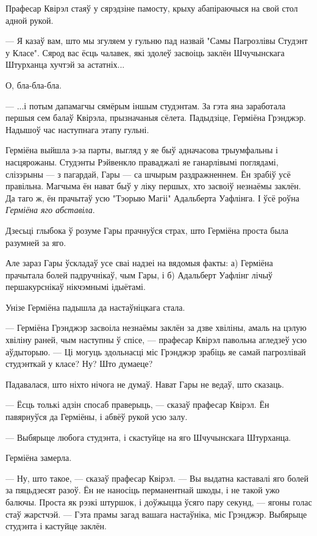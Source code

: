 Прафесар Квірэл стаяў у сярэдзіне памосту, крыху абапіраючыся на свой стол адной рукой.

--- Я казаў вам, што мы згуляем у гульню пад назвай "Самы Пагрозлівы Студэнт у Класе".
Сярод вас ёсць чалавек, які здолеў засвоіць заклён Шчучынскага Штурханца хучтэй за астатніх...

О, бла-бла-бла.

--- ...і потым дапамагчы сямёрым іншым студэнтам. За гэта яна заработала першыя сем балаў 
Квірэла, прызначаныя сёлета. Падыдзіце, Герміёна Грэнджэр. Надышоў час наступнага этапу 
гульні. 

Герміёна выйшла з-за парты, выгляд у яе быў адначасова трыумфальны і насцярожаны.
Студэнты Рэйвенкло праваджалі яе ганарлівымі поглядамі, слізэрыны --- з пагардай,
Гары --- са шчырым раздражненнем. Ён зрабіў усё правільна. Магчыма ён нават быў 
у ліку першых, хто засвоіў незнаёмы заклён. Да таго ж, ён прачытаў усю "Тэорыю Магіі"
Адальберта Уафлінга. І ўсё роўна  \emph{Герміёна яго абставіла}.

Дзесьці глыбока ў розуме Гары прачнуўся страх, што Герміёна проста была 
разумней за яго.

Але зараз Гары ўскладаў усе сваі надзеі на вядомыя факты: а) Герміёна прачытала 
болей падручнікаў, чым Гары, і б) Адальберт Уафлінг лічыў першакурснікаў нікчэмнымі
ідыётамі.

Унізе Герміёна падышла да настаўніцкага стала.

--- Герміёна Грэнджэр засвоіла незнаёмы заклён за дзве хвіліны, амаль на цэлую 
хвіліну раней, чым наступны ў спісе, --- прафесар Квірэл павольна агледзеў 
усю аўдыторыю. --- Ці могуць здольнасці міс Грэнджэр зрабіць яе самай 
пагрозлівай студэнткай у класе? Ну? Што думаеце?

Падавалася, што ніхто нічога не думаў. Нават Гары не ведаў, што сказаць.

--- Ёсць толькі адзін спосаб праверыць, --- сказаў прафесар Квірэл. Ён павярнуўся 
да Герміёны, і абвёў рукой усю залу.

--- Выбярыце любога студэнта, і скастуйце на яго Шчучынскага Штурханца.

Герміёна замерла.

--- Ну, што такое, --- сказаў прафесар Квірэл. --- Вы выдатна каставалі яго 
болей за пяцьдзесят разоў. Ён не наносіць перманентнай шкоды, і не такой ужо балючы.
Проста як рэзкі штуршок, і доўжыцца ўсяго пару секунд, --- ягоны голас стаў жарстчэй.
--- Гэта прамы загад вашага настаўніка, міс Грэнджэр. Выбярыце студэнта і кастуйце
заклён.

